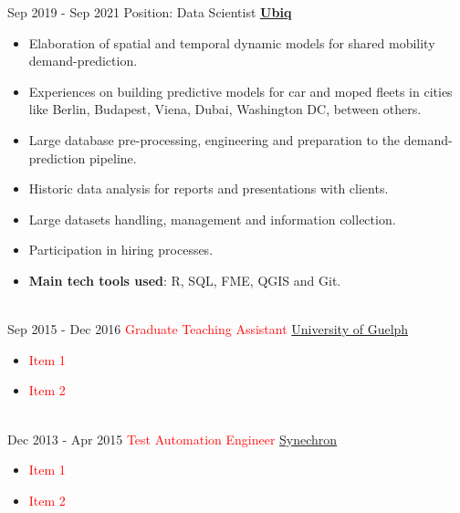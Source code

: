 \documentclass[letterpaper]{twentysecondcv} %
\begin{document}
\begin{twenty}
\twentyitem
    	{Sep 2019 -}
		{Sep 2021}
        {Position: Data Scientist } 
        {\href{http://www.ubiq.ai/}{\normalsize \textbf{\underline{\textcolor{mainblue}{Ubiq}}}}}
        {}
        {\begin{itemize}
        \item Elaboration of spatial and temporal dynamic models for shared mobility demand-prediction. 
        \item Experiences on building predictive models for car and moped fleets in cities like Berlin, Budapest, Viena, Dubai, Washington DC, between others.  
        \item Large database pre-processing, engineering and preparation to the demand-prediction pipeline.
        \item Historic data analysis for reports and presentations with clients.
        \item Large datasets handling, management and information collection. 
        \item Participation in hiring processes. 
        \item \textbf{Main tech tools used}: R, SQL, FME, QGIS and Git.
        \end{itemize}}
        \\
	
    \twentyitem
   		{Sep 2015 -}
		{Dec 2016}
        {\textcolor{red}{Graduate Teaching Assistant}}
        {\href{http://www.uoguelph.ca}{University of Guelph}}
        {}
        {
        {\begin{itemize}
        \item \textcolor{red}{Item 1}
        \item \textcolor{red}{Item 2}
    \end{itemize}}
        }
     \\
     \twentyitem
   		{Dec 2013 -}
		{Apr 2015}
        {\textcolor{red}{Test Automation Engineer}}
        {\href{http://www.synechron.com/}{Synechron}}
        {}
        {
        \begin{itemize}
        \item \textcolor{red}{Item 1}
        \item \textcolor{red}{Item 2}
    \end{itemize}
    	}
        
\end{twenty}

\end{document}
